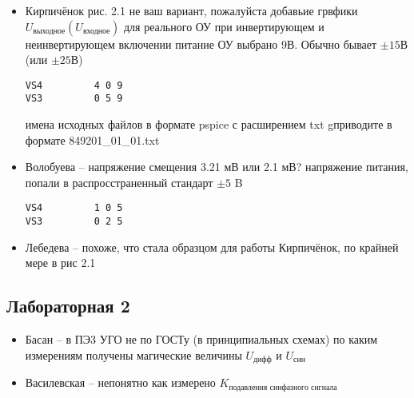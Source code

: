 \documentclass[a4paper,landscape,11pt]{article}
\begin{document}
\begin{itemize}
\item 
	Кирпичёнок рис. 2.1 не ваш вариант, пожалуйста добавьие грвфики  $U_\text{выходное}(U_\text{входное})$ для реального ОУ при инвертирующем и неинвертирующем включении
	питание ОУ выбрано 9В.  Обычно бывает $\pm 15В$ (или $\pm25В$) 
\begin{verbatim}
VS4         4 0 9
VS3         0 5 9
\end{verbatim}
имена  исходных файлов в формате pspice с расширением txt gприводите в формате 849201\_01\_01.txt

\item 
	Волобуева -- напряжение смещения 3.21 мВ или 2.1 мВ? 
напряжение питания, попали в распросстраненный стандарт $\pm5$ B
\begin{verbatim}
VS4         1 0 5
VS3         0 2 5
\end{verbatim}

\item 
	Лебедева -- похоже, что стала образцом для работы Кирпичёнок, по крайней мере в рис 2.1

\end{itemize}

\subsection*{Лабораторная 2}
\begin{itemize}
	\item Басан -- в ПЭ3  УГО не по ГОСТу (в принципиальных схемах)
по каким измерениям получены магические
величины $U_\text{дифф}$ и $U_\text{син}$
\item Василевская -- непонятно как измерено
$K_\text{подавления синфазного сигнала}$
\end{itemize}
\end{document}
